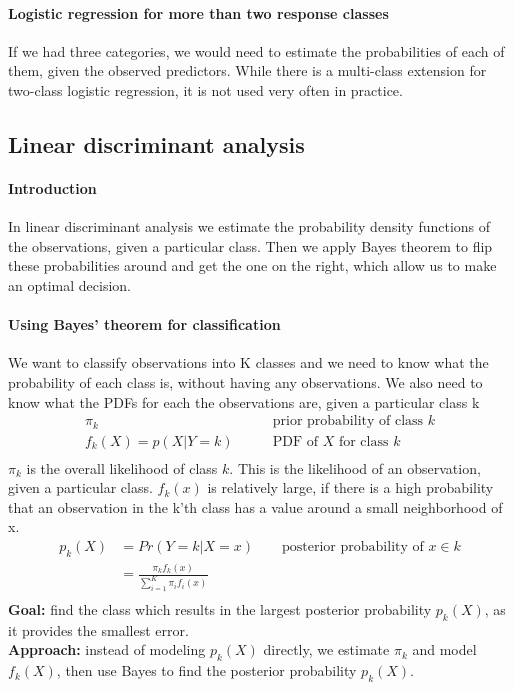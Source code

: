 \documentclass[../document.tex]{subfiles}
\begin{document}
	\paragraph{Logistic regression for more than two response classes}
	If we had three categories, we would need to estimate the probabilities of each of them, given the observed predictors. While there is a multi-class extension for two-class logistic regression, it is not used very often in practice.

	\sectionbreak
	\subsection{Linear discriminant analysis}

	\paragraph{Introduction}
	In linear discriminant analysis we estimate the probability density functions of the observations, given a particular class. Then we apply Bayes theorem to flip these probabilities around and get the one on the right, which allow us to make an optimal decision.

	\paragraph{Using Bayes' theorem for classification}
	We want to classify observations into K classes and we need to know what the probability of each class is, without having any observations.
	We also need to know what the PDFs for each the observations are, given a particular class k
	\begin{equation}
	\begin{split}
		\pi_{k}&\qquad\text{prior probability of class }k\\
		f_{k}(X) = p(X|Y=k)&\qquad\text{PDF of }X\text{ for class }k\\
	\end{split}
	\end{equation}
	$\pi_k$ is the overall likelihood of class $k$.
	This is the likelihood of an observation, given a particular class. \(f_{k}(x)\) is relatively large, if there is a high probability that an observation in the k'th class has a value around a small neighborhood of x.
	\begin{equation}
	\begin{split}
		p_{k}(X)&=Pr(Y=k|X=x)\qquad\text{posterior probability of } x \in k\\
		&=\frac{\pi_{k}f_{k}(x)}{\sum_{i=1}^{K}\pi_{i}f_{i}(x)}\\
	\end{split}
	\end{equation}
	\textbf{Goal:} find the class which results in the largest posterior probability \(p_{k}(X)\), as it provides the smallest error.\\
	\textbf{Approach:} instead of modeling \(p_{k}(X)\) directly, we estimate $\pi_k$ and model $f_{k}(X)$, then use Bayes to find the posterior probability \(p_{k}(X)\).\\
\end{document}
